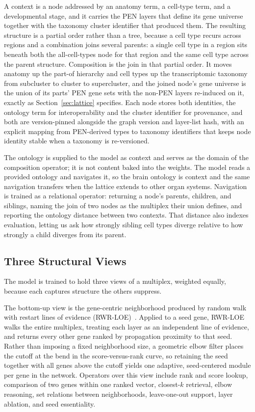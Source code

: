 \documentclass[thesis,letterpaper,12pt]{utthesis}
\begin{document}
A context is a node addressed by an anatomy term, a cell-type term, and a developmental stage, and it carries the PEN layers that define its gene universe together with the taxonomy cluster identifier that produced them. The resulting structure is a partial order rather than a tree, because a cell type recurs across regions and a combination joins several parents: a single cell type in a region sits beneath both the all-cell-types node for that region and the same cell type across the parent structure. Composition is the join in that partial order. It moves anatomy up the part-of hierarchy and cell types up the transcriptomic taxonomy from subcluster to cluster to supercluster, and the joined node's gene universe is the union of its parts' PEN gene sets with the non-PEN layers re-induced on it, exactly as Section~\ref{sec:lattice} specifies. Each node stores both identities, the ontology term for interoperability and the cluster identifier for provenance, and both are version-pinned alongside the graph version and layer-list hash, with an explicit mapping from PEN-derived types to taxonomy identifiers that keeps node identity stable when a taxonomy is re-versioned.

The ontology is supplied to the model as context and serves as the domain of the composition operator; it is not content baked into the weights. The model reads a provided ontology and navigates it, so the brain ontology is context and the same navigation transfers when the lattice extends to other organ systems. Navigation is trained as a relational operator: returning a node's parents, children, and siblings, naming the join of two nodes as the multiplex their union defines, and reporting the ontology distance between two contexts. That distance also indexes evaluation, letting us ask how strongly sibling cell types diverge relative to how strongly a child diverges from its parent.

\subsection{Three Structural Views}\label{sec:pillars}
The model is trained to hold three views of a multiplex, weighted equally, because each captures structure the others suppress.

The bottom-up view is the gene-centric neighborhood produced by random walk with restart lines of evidence (RWR-LOE)~\cite{kainer2025rwrtoolkit}. Applied to a seed gene, RWR-LOE walks the entire multiplex, treating each layer as an independent line of evidence, and returns every other gene ranked by propagation proximity to that seed. Rather than imposing a fixed neighborhood size, a geometric elbow filter places the cutoff at the bend in the score-versus-rank curve, so retaining the seed together with all genes above the cutoff yields one adaptive, seed-centered module per gene in the network. Operators over this view include rank and score lookup, comparison of two genes within one ranked vector, closest-$k$ retrieval, elbow reasoning, set relations between neighborhoods, leave-one-out support, layer ablation, and seed essentiality.
\end{document}

